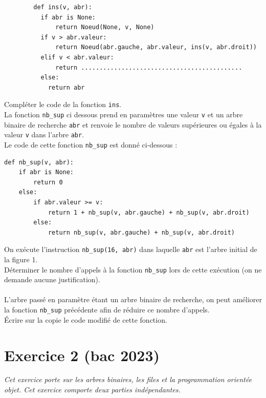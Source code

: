\documentclass[a4paper,12pt,eval,firamath]{nsi}
\begin{document}
\begin{verbatim}
        def ins(v, abr):
          if abr is None:
              return Noeud(None, v, None)
          if v > abr.valeur:
              return Noeud(abr.gauche, abr.valeur, ins(v, abr.droit))
          elif v < abr.valeur:
              return ............................................
          else:
            return abr      
      \end{verbatim}

\question Compléter le code de la fonction \texttt{ins}.\\



La fonction \texttt{nb_sup} ci dessous prend en paramètres une valeur \texttt{v} et un arbre binaire de recherche \texttt{abr} et renvoie le nombre de valeurs supérieures ou égales à la valeur \texttt{v} dans l'arbre \texttt{abr}.\\
Le code de cette fonction \texttt{nb_sup} est donné ci-dessous :

\begin{verbatim}
def nb_sup(v, abr):
    if abr is None:
        return 0
    else:
        if abr.valeur >= v:
            return 1 + nb_sup(v, abr.gauche) + nb_sup(v, abr.droit)
        else:
            return nb_sup(v, abr.gauche) + nb_sup(v, abr.droit)
\end{verbatim}

On exécute l'instruction \texttt{nb_sup(16, abr)} dans laquelle \texttt{abr} est l'arbre initial de la figure 1.\\

\question Déterminer le nombre d'appels à la fonction \texttt{nb_sup} lors de cette exécution (on ne demande aucune justification).\\

\\

L'arbre passé en paramètre étant un arbre binaire de recherche, on peut
améliorer la fonction \texttt{nb_sup} précédente afin de réduire ce nombre d'appels.\\

\question Écrire sur la copie le code modifié de cette fonction.\\



\section*{Exercice 2 \small (bac 2023)}
\resetquestion
\textit{Cet exercice porte sur les arbres binaires, les files et la programmation orientée objet.
      Cet exercice comporte deux parties indépendantes.}\\
\end{document}

